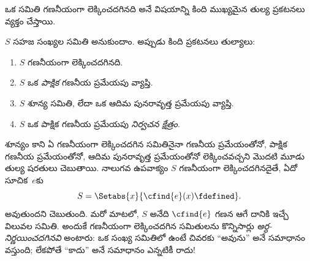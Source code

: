 \documentclass[../../../include/open-logic-section]{subfiles}
\begin{document}



ఒక సమితి గణనీయంగా లెక్కించదగినది అనే విషయాన్ని కింది ముఖ్యమైన తుల్య
ప్రకటనలు వ్యక్తం చేస్తాయి.

\begin{thm}
$S$ సహజ సంఖ్యల సమితి అనుకుందాం. అప్పుడు కింది ప్రకటనలు తుల్యాలు:
\begin{enumerate}
\item{} $S$ గణనీయంగా లెక్కించదగినది.
\item{} $S$ ఒక \emph{పాక్షిక} గణనీయ ప్రమేయపు వ్యాప్తి.
\item{} $S$ శూన్య సమితి, లేదా ఒక ఆదిమ పునరావృత్త ప్రమేయపు వ్యాప్తి.
\item{} $S$ ఒక పాక్షిక గణనీయ ప్రమేయపు \emph{నిర్వచన క్షేత్రం}.
\end{enumerate}
\end{thm}

\begin{explain}
శూన్యం కాని ఏ గణనీయంగా లెక్కించదగిన సమితినైనా గణనీయ ప్రమేయంతోనో,
పాక్షిక గణనీయ ప్రమేయంతోనో, ఆదిమ పునరావృత్త ప్రమేయంతోనో
లెక్కించవచ్చని మొదటి మూడు తుల్య షరతులు చెబుతాయి. నాలుగవ
ఉపవాక్యం $S$ గణనీయంగా లెక్కించదగినదైతే, ఏదో సూచిక~$e$కు
\[
S=\Setabs{x}{\cfind{e}(x)\fdefined}.
\]
అవుతుందని చెబుతుంది. మరో మాటలో, $S$ అనేది $\cfind{e}$ గణన ఆగే
దానికి ఇచ్చే విలువల సమితి. అందుకే గణనీయంగా లెక్కించదగిన సమితులను కొన్నిసార్లు
\emph{అర్ధ-నిర్ణయించదగినవి} అంటారు: ఒక సంఖ్య సమితిలో ఉంటే చివరకు
``అవును'' అనే సమాధానం వస్తుంది; లేకపోతే ``కాదు'' అనే సమాధానం ఎన్నటికీ
రాదు!{}
\end{explain}
\end{document}
